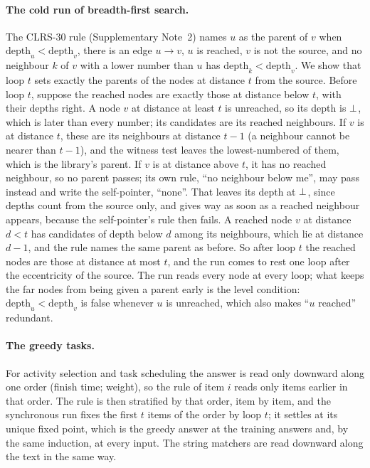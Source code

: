 \paragraph{The cold run of breadth-first search.} The CLRS-30 rule (Supplementary Note~2) names $u$ as the parent of $v$
when $\mathrm{depth}_u < \mathrm{depth}_v$, there is an edge $u \to v$, $u$ is reached, $v$ is not the source, and no
neighbour $k$ of $v$ with a lower number than $u$ has $\mathrm{depth}_k < \mathrm{depth}_v$. We show that loop $t$ sets
exactly the parents of the nodes at distance $t$ from the source. Before loop $t$, suppose the reached nodes are exactly
those at distance below $t$, with their depths right. A node $v$ at distance at least $t$ is unreached, so its depth is
$\bot$, which is later than every number; its candidates are its reached neighbours. If $v$ is at distance $t$, these
are its neighbours at distance $t-1$ (a neighbour cannot be nearer than $t-1$), and the witness test leaves the
lowest-numbered of them, which is the library's parent. If $v$ is at distance above $t$, it has no reached neighbour, so
no parent passes; its own rule, ``no neighbour below me'', may pass instead and write the self-pointer, ``none''. That
leaves its depth at $\bot$, since depths count from the source only, and gives way as soon as a reached neighbour
appears, because the self-pointer's rule then fails. A reached node $v$ at distance $d < t$ has candidates of depth below $d$ among
its neighbours, which lie at distance $d-1$, and the rule names the same parent as before. So after loop $t$ the reached
nodes are those at distance at most $t$, and the run comes to rest one loop after the eccentricity of the source.
The run reads every node at every loop; what keeps the far nodes from being given a parent early is the level condition:
$\mathrm{depth}_u < \mathrm{depth}_v$ is false whenever $u$ is unreached, which also makes ``$u$ reached'' redundant.

\paragraph{The greedy tasks.} For activity selection and task scheduling the answer is read only downward along one
order (finish time; weight), so the rule of item $i$ reads only items earlier in that order. The rule is then stratified
by that order, item by item, and the synchronous run fixes the first $t$ items of the order by loop $t$; it settles at
its unique fixed point, which is the greedy answer at the training answers and, by the same induction, at every input.
The string matchers are read downward along the text in the same way.

